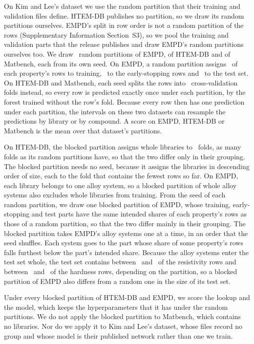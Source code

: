 \documentclass[11pt]{article}
\begin{document}
On Kim and Lee's dataset we use the random partition that their training and
validation files define. HTEM-DB publishes no partition, so we draw its random
partitions ourselves. EMPD's split in row order is not a random partition of
the rows (Supplementary Information Section~S3), so we pool the training and
validation parts that the release publishes and draw EMPD's random partitions
ourselves too. We draw \splitDraws\ random partitions of EMPD, of
HTEM-DB and of Matbench, each from its own seed. On EMPD, a random partition assigns \empdTrainShare\ of each property's rows
to training, \empdStopShare\ to the early-stopping rows and \heldOutShare\ to
the test set. On HTEM-DB and Matbench, each seed splits the rows into
\htemFolds\ cross-validation folds instead, so every row is predicted exactly
once under each partition, by the forest trained without the row's fold. Because
every row then has one prediction under each partition, the intervals on these
two datasets can resample the predictions by library or by compound. A
score on EMPD, HTEM-DB or Matbench is the mean over that dataset's partitions.

On HTEM-DB, the blocked partition assigns whole libraries to \htemFolds\
folds, as many folds as its random partitions have, so that the two differ only
in their grouping. The blocked partition needs no seed, because it assigns the libraries
in descending order of size, each to the fold that contains the fewest rows so
far. On EMPD, each library belongs to one alloy
system, so a blocked partition of whole alloy systems also excludes whole
libraries from training. From the seed of each random partition, we draw one
blocked partition of EMPD, whose training, early-stopping and test parts have
the same intended shares of each property's rows as those of a random partition, so that
the two differ mainly in their grouping. The blocked partition takes EMPD's
alloy systems one at a time, in an order that the seed shuffles. Each system
goes to the part whose share of some property's rows falls furthest below the
part's intended share.
Because the alloy systems enter the test set whole, the
test set contains between \empdResBlockedHeldOutMin\ and
\empdResBlockedHeldOutMax\ of the resistivity rows and between
\empdHardBlockedHeldOutMin\ and \empdHardBlockedHeldOutMax\ of the hardness rows,
depending on the partition, so a blocked partition of EMPD also differs from a
random one in the size of its test set.

Under every blocked partition of HTEM-DB and EMPD, we score the lookup and the
model, which keeps the hyperparameters that it has under the random
partitions. We do not apply the blocked partition to Matbench,
which contains no libraries. Nor do we apply it to Kim and Lee's
dataset, whose files record no group and whose model is their published
network rather than one we train.
\end{document}
